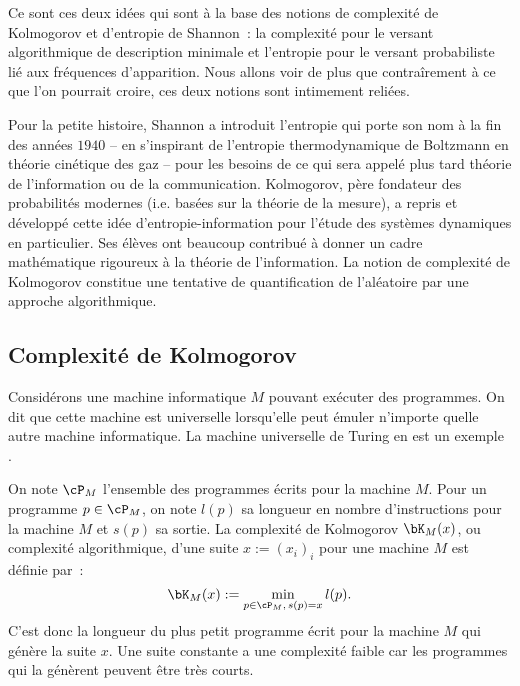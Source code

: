 Ce sont ces deux idées qui sont à la base des notions de complexité de
Kolmogorov et d'entropie de Shannon~: la complexité pour le versant
algorithmique de description minimale et l'entropie pour le versant
probabiliste lié aux fréquences d'apparition. Nous allons voir de plus que
contraîrement à ce que l'on pourrait croire, ces deux notions sont intimement
reliées.

Pour la petite histoire, Shannon a introduit l'entropie qui porte son nom à la
fin des années $1940$ -- en s'inspirant de l'entropie thermodynamique de
Boltzmann en théorie cinétique des gaz -- pour les besoins de ce qui sera
appelé plus tard théorie de l'information ou de la communication. Kolmogorov,
père fondateur des probabilités modernes (i.e. basées sur la théorie de la
mesure), a repris et développé cette idée d'entropie-information pour l'étude
des systèmes dynamiques en particulier. Ses élèves ont beaucoup contribué à
donner un cadre mathématique rigoureux à la théorie de l'information. La
notion de complexité de Kolmogorov constitue une tentative de quantification
de l'aléatoire par une approche algorithmique.

\subsection{Complexité de Kolmogorov}\label{ss:kolmogorov}

Considérons une machine informatique $M$ pouvant exécuter des programmes.  On
dit que cette machine est universelle lorsqu'elle peut émuler n'importe quelle
autre machine informatique. La machine universelle de Turing en est un exemple
\cite{turing-girard}.
 
On note $\cP_M$ l'ensemble des programmes écrits pour la machine $M$. Pour un
programme $p\in\cP_M$, on note $l(p)$ sa longueur en nombre d'instructions pour
la machine $M$ et $s(p)$ sa sortie. La complexité de Kolmogorov $\bK_M(x)$, ou
complexité algorithmique, d'une suite $x:=(x_i)_i$ pour une machine $M$ est
définie par~:
$$
\bK_M(x):=\min_{p\in\cP_M,\,s(p)=x} l(p).
$$
C'est donc la longueur du plus petit programme écrit pour la machine $M$
qui génère la suite $x$.  Une suite constante a une complexité faible car les
programmes qui la génèrent peuvent être très courts.

